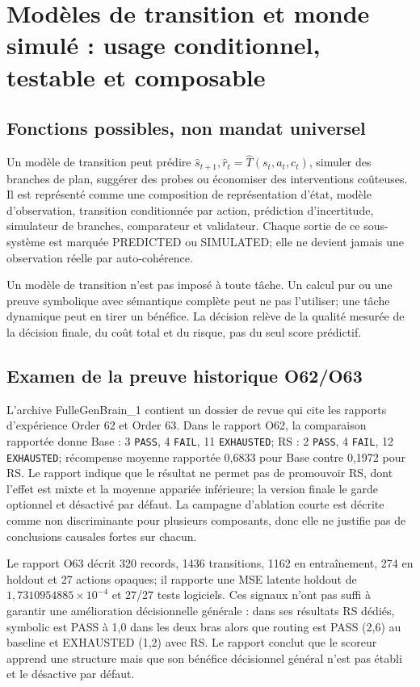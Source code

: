\documentclass[11pt,a4paper]{article}
\newcommand{\State}[1]{\textsf{#1}}
\begin{document}
\section{Modèles de transition et monde simulé : usage conditionnel, testable et composable}
\subsection{Fonctions possibles, non mandat universel}
Un modèle de transition peut prédire \(\hat{s}_{t+1},\hat{r}_t=\hat{T}(s_t,a_t,c_t)\), simuler des branches de plan, suggérer des probes ou économiser des interventions coûteuses. Il est représenté comme une composition de représentation d'état, modèle d'observation, transition conditionnée par action, prédiction d'incertitude, simulateur de branches, comparateur et validateur. Chaque sortie de ce sous-système est marquée \State{PREDICTED} ou \State{SIMULATED}; elle ne devient jamais une observation réelle par auto-cohérence.

Un modèle de transition n'est pas imposé à toute tâche. Un calcul pur ou une preuve symbolique avec sémantique complète peut ne pas l'utiliser; une tâche dynamique peut en tirer un bénéfice. La décision relève de la qualité mesurée de la décision finale, du coût total et du risque, pas du seul score prédictif.

\subsection{Examen de la preuve historique O62/O63}
L'archive FulleGenBrain\_1 contient un dossier de revue qui cite les rapports d'expérience Order 62 et Order 63. Dans le rapport O62, la comparaison rapportée donne Base : 3 \texttt{PASS}, 4 \texttt{FAIL}, 11 \texttt{EXHAUSTED}; RS : 2 \texttt{PASS}, 4 \texttt{FAIL}, 12 \texttt{EXHAUSTED}; récompense moyenne rapportée 0,6833 pour Base contre 0,1972 pour RS. Le rapport indique que le résultat ne permet pas de promouvoir RS, dont l'effet est mixte et la moyenne appariée inférieure; la version finale le garde optionnel et désactivé par défaut. La campagne d'ablation courte est décrite comme non discriminante pour plusieurs composants, donc elle ne justifie pas de conclusions causales fortes sur chacun.

Le rapport O63 décrit 320 records, 1436 transitions, 1162 en entraînement, 274 en holdout et 27 actions opaques; il rapporte une MSE latente holdout de \(1{,}7310954885\times10^{-4}\) et 27/27 tests logiciels. Ces signaux n'ont pas suffi à garantir une amélioration décisionnelle générale : dans ses résultats RS dédiés, symbolic est PASS à 1,0 dans les deux bras alors que routing est PASS (2,6) au baseline et EXHAUSTED (1,2) avec RS. Le rapport conclut que le scoreur apprend une structure mais que son bénéfice décisionnel général n'est pas établi et le désactive par défaut.
\end{document}
